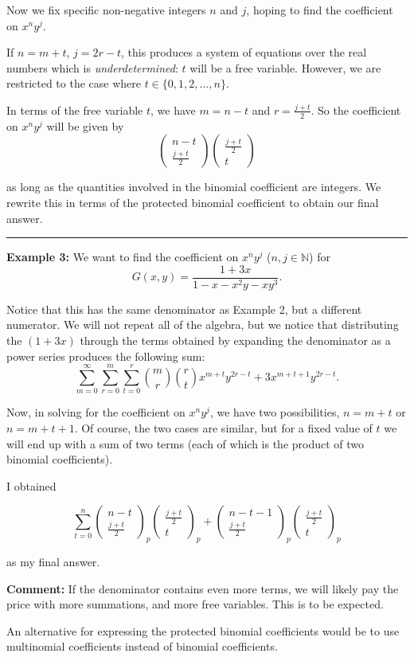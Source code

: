 \documentclass[11pt]{article}
\newcommand{\tallbinom}[2]{\left( \begin{array}{c} {#1} \\[8pt] {#2} \end{array} \right)}
\begin{document}
Now we fix specific non-negative integers $n$ and $j$, hoping to find the coefficient on $x^n y^j$. 

If $n = m + t$, $j = 2r - t$, this produces a system of equations over the real numbers which is \textit{underdetermined}: $t$ will be a free variable. However, we are restricted to the case where $t \in \{0, 1, 2, \ldots, n\}$. 

In terms of the free variable $t$, we have $m = n - t$ and $r = \displaystyle\frac{j + t}{2}$. So the coefficient on $x^n y^j$ will be given by 
\[
\tallbinom{n -t}{\frac{j+t}{2}} \tallbinom{ \frac{j+t}{2}}{t} 
\]

as long as the quantities involved in the binomial coefficient are integers. We rewrite this in terms of the protected binomial coefficient to obtain our final answer. 

\hrule 

\textbf{Example 3:} We want to find the coefficient on $x^n y^j$ ($n, j \in \mathbb{N}$) for 
\[
G(x,y) = \displaystyle\frac{1 + 3x}{1 - x - x^2y - xy^3}. 
\]

Notice that this has the same denominator as Example 2, but a different numerator. We will not repeat all of the algebra, but we notice that distributing the $(1 + 3x)$ through the terms obtained by expanding the denominator as a power series produces the following sum: \\

\[
 \displaystyle\sum_{m = 0}^\infty \displaystyle\sum_{r = 0}^m \displaystyle\sum_{t = 0}^r \binom{m}{r} \binom{r}{t} x^{m+t} y^{2r - t} + 3x^{m+t+1}y^{2r - t}.
\]

Now, in solving for the coefficient on $x^n y^j$, we have two possibilities, $n = m + t$ or $n = m + t + 1$. Of course, the two cases are similar, but for a fixed value of $t$ we will end up with a sum of two terms (each of which is the product of two binomial coefficients). 

I obtained 

\[
\displaystyle\sum_{t = 0}^n \tallbinom{n - t}{\frac{j + t}{2}}_p \tallbinom{\frac{j + t}{2}}{t}_p + \tallbinom{n - t - 1}{\frac{j + t}{2}}_p \tallbinom{\frac{j + t}{2}}{t}_p
\]

as my final answer. 

\textbf{Comment:} If the denominator contains even more terms, we will likely pay the price with more summations, and more free variables. This is to be expected.

An alternative for expressing the protected binomial coefficients would be to use multinomial coefficients instead of binomial coefficients. 
\end{document}
